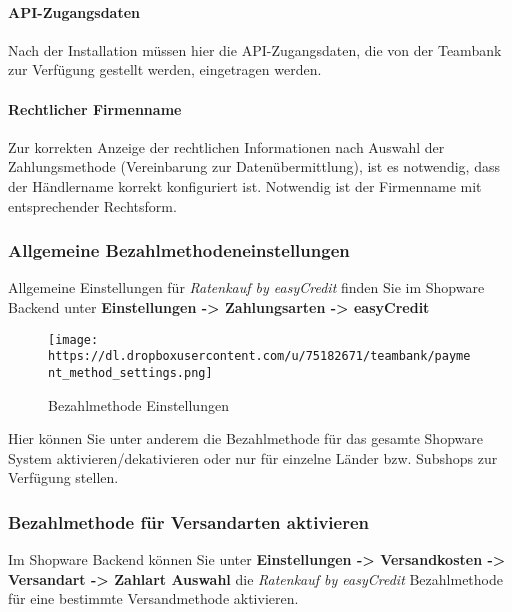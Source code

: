 \paragraph{API-Zugangsdaten}\label{api-zugangsdaten}

Nach der Installation müssen hier die API-Zugangsdaten, die von der
Teambank zur Verfügung gestellt werden, eingetragen werden.

\paragraph{Rechtlicher Firmenname}\label{rechtlicher-firmenname}

Zur korrekten Anzeige der rechtlichen Informationen nach Auswahl der
Zahlungsmethode (Vereinbarung zur Datenübermittlung), ist es notwendig,
dass der Händlername korrekt konfiguriert ist. Notwendig ist der
Firmenname mit entsprechender Rechtsform.

\subsubsection{Allgemeine
Bezahlmethodeneinstellungen}\label{allgemeine-bezahlmethodeneinstellungen}

Allgemeine Einstellungen für \emph{Ratenkauf by easyCredit} finden Sie
im Shopware Backend unter \textbf{Einstellungen -\textgreater{}
Zahlungsarten -\textgreater{} easyCredit}

\begin{figure}[htbp]
\centering
\texttt{[image: https://dl.dropboxusercontent.com/u/75182671/teambank/payment\_method\_settings.png]}
\caption{Bezahlmethode Einstellungen}
\end{figure}

Hier können Sie unter anderem die Bezahlmethode für das gesamte Shopware
System aktivieren/dekativieren oder nur für einzelne Länder bzw.
Subshops zur Verfügung stellen.

\subsubsection{Bezahlmethode für Versandarten
aktivieren}\label{bezahlmethode-fuxfcr-versandarten-aktivieren}

Im Shopware Backend können Sie unter \textbf{Einstellungen
-\textgreater{} Versandkosten -\textgreater{} Versandart -\textgreater{}
Zahlart Auswahl} die \emph{Ratenkauf by easyCredit} Bezahlmethode für
eine bestimmte Versandmethode aktivieren.

